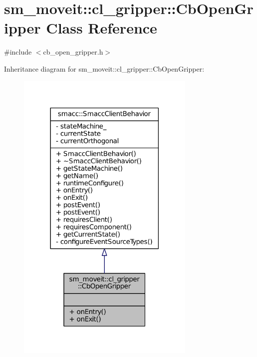 \hypertarget{classsm__moveit_1_1cl__gripper_1_1CbOpenGripper}{}\section{sm\+\_\+moveit\+:\+:cl\+\_\+gripper\+:\+:Cb\+Open\+Gripper Class Reference}
\label{classsm__moveit_1_1cl__gripper_1_1CbOpenGripper}


{\ttfamily \#include $<$cb\+\_\+open\+\_\+gripper.\+h$>$}



Inheritance diagram for sm\+\_\+moveit\+:\+:cl\+\_\+gripper\+:\+:Cb\+Open\+Gripper\+:
\nopagebreak
\begin{figure}[H]
\begin{center}
\leavevmode
\includegraphics[width=242pt]{classsm__moveit_1_1cl__gripper_1_1CbOpenGripper__inherit__graph}
\end{center}
\end{figure}


